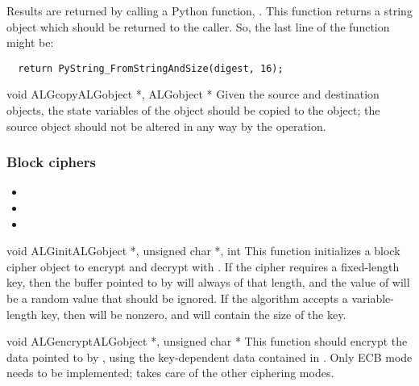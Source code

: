 \documentclass{howto}
\begin{document}
Results are returned by calling a Python function,
.  This
function returns a string object which should be returned to the
caller.  So, the last line of the 
function might be:
\begin{verbatim}
  return PyString_FromStringAndSize(digest, 16);
\end{verbatim}

\begin{funcdesc}{void ALGcopy}{\rm ALGobject *, ALGobject *}
Given the source and destination objects, the state variables of the
 object should be copied to the  object; the
source object should not be altered in any way by the operation.
\end{funcdesc}

\subsubsection{Block ciphers}
\begin{itemize}
\item {}
\item {}
\item {}
\end{itemize}

\begin{funcdesc}{void ALGinit}{\rm ALGobject *, unsigned char *, int }
This function initializes a block cipher object to encrypt and decrypt
with .  If the cipher requires a fixed-length key, then the
buffer pointed to by  will always of that length, and the
value of  will be a random value that should be ignored.
If the algorithm accepts a variable-length key, then  will
be nonzero, and will contain the size of the key.
\end{funcdesc}

\begin{funcdesc}{void ALGencrypt}{\rm ALGobject *, unsigned char *}
This function should encrypt the data pointed to by , using
the key-dependent data contained in .  Only ECB mode needs
to be implemented;  takes care of the other
ciphering modes.
\end{funcdesc}
\end{document}
